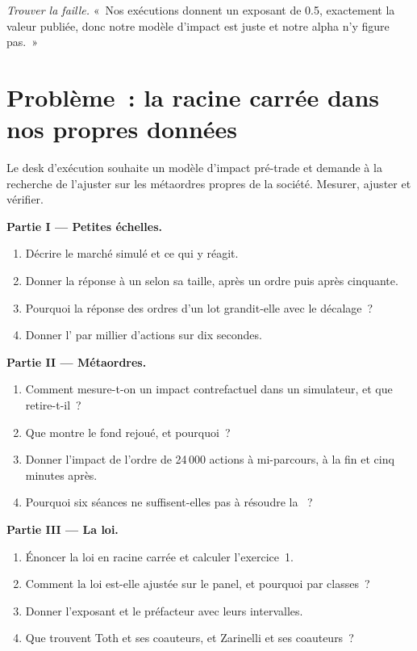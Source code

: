 \begin{exercise}[$\star\star\star$]\label{exo:mx:the-empirics-of-price-impact:8}
\emph{Trouver la faille.} «~Nos exécutions donnent un exposant de 0.5, exactement la valeur publiée, donc notre modèle d'impact est juste et notre alpha n'y figure pas.~»
\end{exercise}

\section{Problème~: la racine carrée dans nos propres données}

\begin{problem}\label{pb:mx:the-empirics-of-price-impact:1}
Le desk d'exécution souhaite un modèle d'impact pré-trade et demande à la recherche de l'ajuster sur les métaordres propres de la société. Mesurer, ajuster et vérifier.

\medskip\noindent\textbf{Partie I --- Petites échelles.}
\begin{enumerate}
\item Décrire le marché simulé et ce qui y réagit.
\item Donner la réponse à un  selon sa taille, après un ordre puis après cinquante.
\item Pourquoi la réponse des ordres d'un lot grandit-elle avec le décalage~?
\item Donner l' par millier d'actions sur dix secondes.
\end{enumerate}

\medskip\noindent\textbf{Partie II --- Métaordres.}
\begin{enumerate}[resume]
\item Comment mesure-t-on un impact contrefactuel dans un simulateur, et que retire-t-il~?
\item Que montre le fond rejoué, et pourquoi~?
\item Donner l'impact de l'ordre de 24\,000 actions à mi-parcours, à la fin et cinq minutes après.
\item Pourquoi six séances ne suffisent-elles pas à résoudre la ~?
\end{enumerate}

\medskip\noindent\textbf{Partie III --- La loi.}
\begin{enumerate}[resume]
\item Énoncer la loi en racine carrée et calculer l'exercice~1.
\item Comment la loi est-elle ajustée sur le panel, et pourquoi par classes~?
\item Donner l'exposant et le préfacteur avec leurs intervalles.
\item Que trouvent Toth et ses coauteurs, et Zarinelli et ses coauteurs~?
\end{enumerate}


\end{problem}

